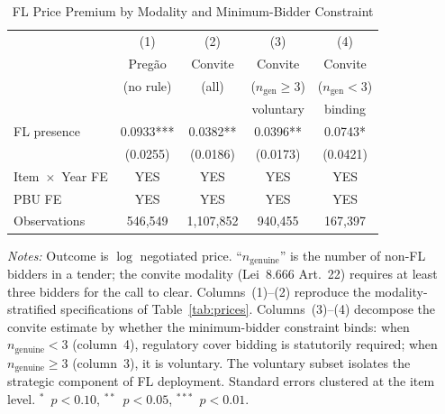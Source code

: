 \begin{table}[htbp]
\centering
\caption{FL Price Premium by Modality and Minimum-Bidder Constraint}
\label{tab:modal_id}
\begin{threeparttable}
\small
\begin{tabular}{lcccc}
\toprule
 & (1) & (2) & (3) & (4) \\
 & Preg\~ao & Convite & Convite & Convite \\
 & (no rule) & (all) & ($n_{\text{gen}} \geq 3$) & ($n_{\text{gen}} < 3$) \\
 &  &  & voluntary & binding \\
\midrule
FL presence & 0.0933*** & 0.0382** & 0.0396** & 0.0743* \\
            & (0.0255) & (0.0186) & (0.0173) & (0.0421) \\
\midrule
Item~$\times$~Year FE & YES & YES & YES & YES \\
PBU FE                & YES & YES & YES & YES \\
Observations          & 546,549 & 1,107,852 & 940,455 & 167,397 \\
\bottomrule
\end{tabular}
\begin{tablenotes}
\small
\item \textit{Notes:} Outcome is $\log$ negotiated price.
``$n_{\text{genuine}}$'' is the number of non-FL bidders in a tender;
the convite modality (Lei~8.666 Art.~22) requires at least three
bidders for the call to clear. Columns~(1)--(2) reproduce the
modality-stratified specifications of Table~\ref{tab:prices}.
Columns~(3)--(4) decompose the convite estimate by whether the
minimum-bidder constraint binds: when $n_{\text{genuine}} < 3$
(column~4), regulatory cover bidding is statutorily required; when
$n_{\text{genuine}} \geq 3$ (column~3), it is voluntary. The
voluntary subset isolates the strategic component of FL deployment.
Standard errors clustered at the item level.
$^{*}$~$p<0.10$, $^{**}$~$p<0.05$, $^{***}$~$p<0.01$.
\end{tablenotes}
\end{threeparttable}
\end{table}
